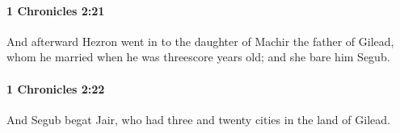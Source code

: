 		\paragraph{1 Chronicles 2:21} %
			\label{1CHRONICLES-2-21}

			And afterward Hezron went in to the daughter of Machir the father of Gilead, whom he married when he was threescore years old; and she bare him Segub.


		\paragraph{1 Chronicles 2:22} %
			\label{1CHRONICLES-2-22}

			And Segub begat Jair, who had three and twenty cities in the land of Gilead.


